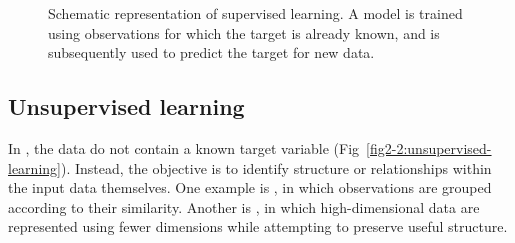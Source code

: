 \begin{figure}[htbp]
{%
  }

  \caption{
    Schematic representation of supervised learning.
    A model is trained using observations for which the target is already known, and is subsequently used to predict the target for new data.
  }
  \label{fig2-1:supervised-learning}
\end{figure}

\subsection{Unsupervised learning}

In , the data do not contain a known target variable (Fig~\ref{fig2-2:unsupervised-learning}).
Instead, the objective is to identify structure or relationships within the input data themselves.
One example is , in which observations are grouped according to their similarity.
Another is , in which high-dimensional data are represented using fewer dimensions while attempting to preserve useful structure.

